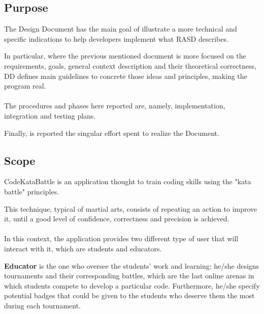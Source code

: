 \subsection{Purpose}
The Design Document has the main goal of illustrate a more technical and specific indications to help developers implement what RASD describes.

In particular, where the previous mentioned document is more focused on the requirements, goals, general context description and their theoretical correctness, DD defines main guidelines to concrete those ideas and principles, 
making the program real.\\
\\
The procedures and phases here reported are, namely, implementation, integration and testing plans.

Finally, is reported the singular effort spent to realize the Document.

\subsection{Scope}
CodeKataBattle is an application thought to train coding skills using the "kata battle" principles. 

This technique, typical of martial arts, consists of repeating an action to improve it, until a good level of confidence, correctness and precision is achieved.\\
\\
In this context, the application provides two different type of user that will interact with it, which are students and educators.

\textbf{Educator} is the one who oversee the students' work and learning: he/she designs tournaments and their corresponding battles, which are the last online arenas in which students compete to develop a particular code. Furthermore, 
he/she specify potential badges that could be given to the students who deserve them the most during each tournament.


